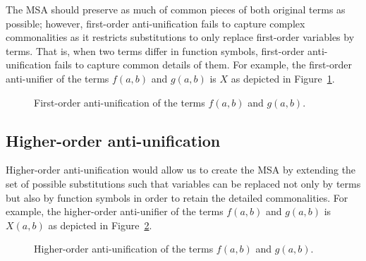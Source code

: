 The MSA should preserve as much of common pieces of both original terms as possible; however, first-order anti-unification fails to capture complex commonalities as it restricts substitutions to only replace first-order variables by terms. That is, when two terms differ in function symbols, first-order anti-unification fails to capture common details of them. For example, the first-order anti-unifier of the terms $f(a,b)$ and $g(a,b)$ is $X$ as depicted in Figure~\ref{fig:first-anti-uni}.

\begin{figure}[t]
\centering{}
\caption{First-order anti-unification of the terms $f(a,b)$ and $g(a,b)$.\label{fig:first-anti-uni}}
\end{figure}

\subsection{Higher-order anti-unification}

Higher-order anti-unification would allow us to create the MSA by extending the set of possible substitutions such that variables can be replaced not only by terms but also by function symbols in order to retain the detailed commonalities. For example, the higher-order anti-unifier of the terms $f(a,b)$ and $g(a,b)$ is $X(a,b)$ as depicted in Figure~\ref{fig:higher-anti-uni}.
\begin{figure}[t]
\centering{}
\caption{Higher-order anti-unification of the terms $f(a,b)$ and $g(a,b)$.\label{fig:higher-anti-uni}}
\end{figure}

